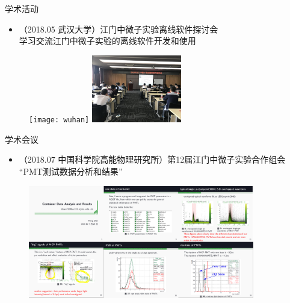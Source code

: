 \documentclass[11pt,compress,xcolor=x11names,UTF8]{beamer}
\begin{document}
\begin{frame}{学术活动}
\begin{itemize}
\item （2018.05 武汉大学）江门中微子实验离线软件探讨会\\
	\alert{学习交流江门中微子实验的离线软件开发和使用}
\end{itemize}
\begin{figure}
\centering
\texttt{[image: wuhan]} %
\includegraphics[width=0.35\textwidth]{junosoft} %
\end{figure}
\end{frame}
\begin{frame}{学术会议}
\begin{itemize}
\item （2018.07 中国科学院高能物理研究所）第12届江门中微子实验合作组会\\
	\alert{“PMT测试数据分析和结果”}
\end{itemize}
\begin{figure}
\centering
\includegraphics[width=0.88\textwidth]{pmt} %
\end{figure}
\end{frame}
\end{document}
